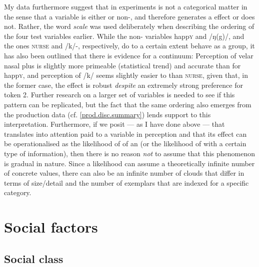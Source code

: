 My data furthermore suggest that  in   experiments is not a categorical matter in the sense that a variable is either  or non-, and therefore generates a  effect or does not.
Rather, the word \emph{scale} was used deliberately when describing the ordering of the four test variables earlier.
While the non- variables happ\textsc{y} and /ŋ(g)/, and the  ones \textsc{nurse} and /k/-, respectively, do to a certain extent behave as a group, it has also been outlined that there is evidence for a continuum: Perception of velar nasal plus is slightly more primeable (statistical trend) and accurate than for happ\textsc{y}, and perception of /k/ seems slightly easier to  than \textsc{nurse}, given that, in the former case, the effect is robust \emph{despite} an extremely strong preference for token 2.
Further research on a larger set of variables is needed to see if this pattern can be replicated, but the fact that the same ordering also emerges from the production data (cf. \ref{prod.disc.summary}) lends support to this interpretation.
Furthermore, if we posit --- as I have done above --- that  translates into attention paid to a variable in perception and that its effect can be operationalised as the likelihood of  of an  (or the likelihood of  with a certain type of information), then there is no reason \emph{not} to assume that this phenomenon is gradual in nature.
Since a likelihood can assume a theoretically infinite number of concrete values, there can also be an infinite number of  clouds that differ in terms of size/detail and the number of exemplars that are indexed for a specific category.

	\section{Social factors}
		\label{sec.perc_res.disc.social}

		\subsection{Social class}

